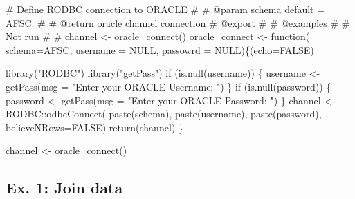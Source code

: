 \documentclass[
  letterpaper,
  oneside,
  open=any]{scrbook}
\newenvironment{Shaded}{\begin{snugshade}}{\end{snugshade}}
\newcommand{\AttributeTok}[1]{\textcolor[rgb]{0.40,0.45,0.13}{#1}}
\newcommand{\CommentTok}[1]{\textcolor[rgb]{0.37,0.37,0.37}{#1}}
\newcommand{\ConstantTok}[1]{\textcolor[rgb]{0.56,0.35,0.01}{#1}}
\newcommand{\ControlFlowTok}[1]{\textcolor[rgb]{0.00,0.23,0.31}{#1}}
\newcommand{\FunctionTok}[1]{\textcolor[rgb]{0.28,0.35,0.67}{#1}}
\newcommand{\NormalTok}[1]{\textcolor[rgb]{0.00,0.23,0.31}{#1}}
\newcommand{\OtherTok}[1]{\textcolor[rgb]{0.00,0.23,0.31}{#1}}
\newcommand{\SpecialCharTok}[1]{\textcolor[rgb]{0.37,0.37,0.37}{#1}}
\newcommand{\StringTok}[1]{\textcolor[rgb]{0.13,0.47,0.30}{#1}}
\begin{document}
\begin{Shaded}
\begin{Highlighting}[]
 \CommentTok{\#\textquotesingle{} Define RODBC connection to ORACLE}
 \CommentTok{\#\textquotesingle{}}
 \CommentTok{\#\textquotesingle{} @param schema default = \textquotesingle{}AFSC\textquotesingle{}. }
 \CommentTok{\#\textquotesingle{}}
 \CommentTok{\#\textquotesingle{} @return oracle channel connection}
 \CommentTok{\#\textquotesingle{} @export}
 \CommentTok{\#\textquotesingle{}}
 \CommentTok{\#\textquotesingle{} @examples}
 \CommentTok{\#\textquotesingle{} \# Not run}
 \CommentTok{\#\textquotesingle{} \# channel \textless{}{-} oracle\_connect()}
\NormalTok{oracle\_connect }\OtherTok{\textless{}{-}} \ControlFlowTok{function}\NormalTok{(}
    \AttributeTok{schema=}\StringTok{\textquotesingle{}AFSC\textquotesingle{}}\NormalTok{, }
    \AttributeTok{username =} \ConstantTok{NULL}\NormalTok{, }
    \AttributeTok{passowrd =} \ConstantTok{NULL}\NormalTok{)\{(}\AttributeTok{echo=}\ConstantTok{FALSE}\NormalTok{)}
  
  \FunctionTok{library}\NormalTok{(}\StringTok{"RODBC"}\NormalTok{)}
  \FunctionTok{library}\NormalTok{(}\StringTok{"getPass"}\NormalTok{)}
  \ControlFlowTok{if}\NormalTok{ (}\FunctionTok{is.null}\NormalTok{(username)) \{}
\NormalTok{    username }\OtherTok{\textless{}{-}} \FunctionTok{getPass}\NormalTok{(}\AttributeTok{msg =} \StringTok{"Enter your ORACLE Username: "}\NormalTok{)}
\NormalTok{  \}}
  \ControlFlowTok{if}\NormalTok{ (}\FunctionTok{is.null}\NormalTok{(password)) \{}
\NormalTok{    password }\OtherTok{\textless{}{-}} \FunctionTok{getPass}\NormalTok{(}\AttributeTok{msg =} \StringTok{"Enter your ORACLE Password: "}\NormalTok{)}
\NormalTok{  \}}
\NormalTok{  channel  }\OtherTok{\textless{}{-}}\NormalTok{ RODBC}\SpecialCharTok{::}\FunctionTok{odbcConnect}\NormalTok{(}
    \FunctionTok{paste}\NormalTok{(schema),}
    \FunctionTok{paste}\NormalTok{(username),}
    \FunctionTok{paste}\NormalTok{(password), }
    \AttributeTok{believeNRows=}\ConstantTok{FALSE}\NormalTok{)}
  \FunctionTok{return}\NormalTok{(channel)}
\NormalTok{\}}

\NormalTok{channel }\OtherTok{\textless{}{-}} \FunctionTok{oracle\_connect}\NormalTok{()}
\end{Highlighting}
\end{Shaded}

\hypertarget{ex.-1-join-data}{%
\subsection{Ex. 1: Join data}\label{ex.-1-join-data}}
\end{document}
